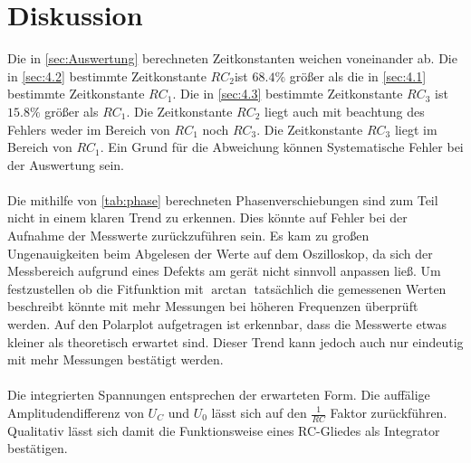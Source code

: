 \section{Diskussion}
\label{sec:Diskussion}
Die in \autoref{sec:Auswertung} berechneten Zeitkonstanten weichen voneinander ab. Die in \autoref{sec:4.2} bestimmte Zeitkonstante $RC_2$ist 
$68.4\%$ größer als die in \autoref{sec:4.1} bestimmte Zeitkonstante $RC_1$. Die in \autoref{sec:4.3} bestimmte Zeitkonstante $RC_3$ ist $15.8\%$ größer als $RC_1$.
Die Zeitkonstante $RC_2$ liegt auch mit beachtung des Fehlers weder im Bereich von $RC_1$ noch $RC_3$. 
Die Zeitkonstante $RC_3$ liegt im Bereich von $RC_1$.
Ein Grund für die Abweichung können Systematische Fehler bei der Auswertung sein.%
\\
\\
Die mithilfe von \autoref{tab:phase} berechneten Phasenverschiebungen sind zum Teil nicht in einem klaren Trend zu erkennen.
Dies könnte auf Fehler bei der Aufnahme der Messwerte zurückzuführen sein. Es kam zu großen Ungenauigkeiten beim Abgelesen 
der Werte auf dem Oszilloskop, da sich der Messbereich aufgrund eines Defekts am gerät nicht sinnvoll anpassen ließ. 
Um festzustellen ob die Fitfunktion mit $\arctan$ tatsächlich die gemessenen Werten beschreibt könnte mit mehr Messungen bei höheren Frequenzen überprüft werden. 
Auf den Polarplot aufgetragen ist erkennbar, dass die Messwerte etwas kleiner als theoretisch erwartet sind. Dieser Trend kann jedoch auch nur eindeutig mit mehr Messungen bestätigt werden.
\\
\\
Die integrierten Spannungen entsprechen der erwarteten Form.
Die auffälige Amplitudendifferenz von $U_C$ und $U_0$ lässt sich auf den $\frac{1}{RC}$ Faktor zurückführen.
Qualitativ lässt sich damit die Funktionsweise eines RC-Gliedes als Integrator bestätigen. 
\newpage